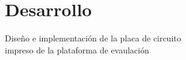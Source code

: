 \section{Desarrollo} \label{desarrollo}
\thispagestyle{plain}

\vspace{0.5cm}

\Large\scshape
\begin{center}
    {\Medium Diseño e implementación de la placa de circuito \\impreso de la plataforma de evaulación}
\end{center}
\normalfont

\divider

\lipsum[1]\\

\lipsum[2]\\